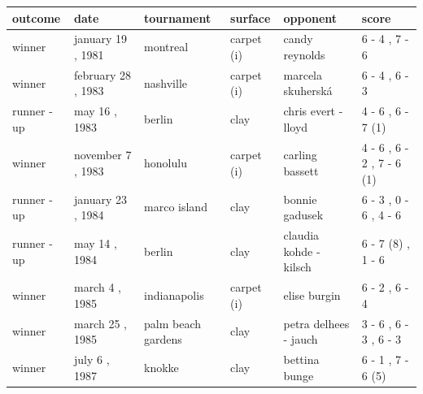\documentclass{article}
\begin{document}
\begin{tabular}{llllll}
\toprule
outcome & date & tournament & surface & opponent & score \\
\midrule
winner & january 19 , 1981 & montreal & carpet (i) & candy reynolds & 6 - 4 , 7 - 6 \\
winner & february 28 , 1983 & nashville & carpet (i) & marcela skuherská & 6 - 4 , 6 - 3 \\
runner - up & may 16 , 1983 & berlin & clay & chris evert - lloyd & 4 - 6 , 6 - 7 (1) \\
winner & november 7 , 1983 & honolulu & carpet (i) & carling bassett & 4 - 6 , 6 - 2 , 7 - 6 (1) \\
runner - up & january 23 , 1984 & marco island & clay & bonnie gadusek & 6 - 3 , 0 - 6 , 4 - 6 \\
runner - up & may 14 , 1984 & berlin & clay & claudia kohde - kilsch & 6 - 7 (8) , 1 - 6 \\
winner & march 4 , 1985 & indianapolis & carpet (i) & elise burgin & 6 - 2 , 6 - 4 \\
winner & march 25 , 1985 & palm beach gardens & clay & petra delhees - jauch & 3 - 6 , 6 - 3 , 6 - 3 \\
winner & july 6 , 1987 & knokke & clay & bettina bunge & 6 - 1 , 7 - 6 (5) \\
\bottomrule
\end{tabular}
\end{document}
